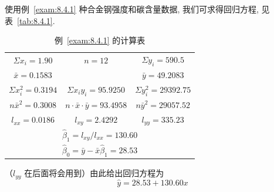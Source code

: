 \begin{example}\label{exam:8.4.2}
使用例~\ref{exam:8.4.1} 种合金钢强度和碳含量数据, 我们可求得回归方程, 见表~\ref{tab:8.4.1}.

\begin{table}[htbp]
  \centering
  \caption{例~\ref{exam:8.4.1} 的计算表\label{tab:8.4.2}}
  \begin{tabular}{ccc}
  \toprule
   $\Sigma x_i =1.90$          &     $n=12$                           & $\Sigma y_i = 590.5$       \\
   $\bar{x} = 0.1583$          &                                      & $\bar{y}  = 49.2083$       \\
   $\Sigma x_{i}^{2} = 0.3194$ & $\Sigma x_iy_i=95.9250  $            & $\Sigma y_i^2 = 29392.75$  \\
   $ n \bar{x}^2 = 0.3008$     & $n\cdot\bar{x}\cdot\bar{y}=93.4958 $ & $n\bar{y}^2 = 29057.52$    \\
   $ l_{xx} = 0.0186$          & $l_{xy} = 2.4292$                    & $l_{yy}=335.23$            \\
   \midrule
   \multicolumn{3}{c}{ $\hat{\beta}_1 = l_{xy}/l_{xx} = 130.60$ }                                  \\
   \multicolumn{3}{c}{ $\hat{\beta}_0 = \bar{y} - \bar{x} \hat{\beta}_1=28.53$ }                   \\
   \bottomrule
  \end{tabular}%
\end{table}%

（$l_{yy}$ 在后面将会用到）由此给出回归方程为
\begin{equation*}
  \hat{y} = 28.53 + 130.60 x 
\end{equation*}
\end{example}

